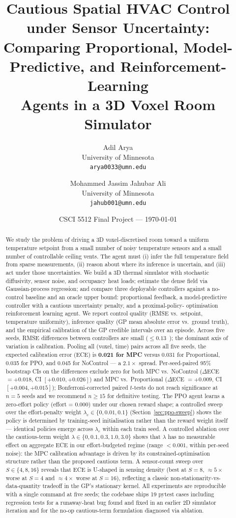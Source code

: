 \documentclass[11pt,letterpaper]{article}
\title{Cautious Spatial HVAC Control under Sensor Uncertainty:\\
       Comparing Proportional, Model-Predictive, and Reinforcement-Learning\\
       Agents in a 3D Voxel Room Simulator}
\author{
  Adil Arya \\ University of Minnesota \\ \texttt{arya0033@umn.edu}
  \and
  Mohammed Jassim Jahubar Ali \\ University of Minnesota \\ \texttt{jahub001@umn.edu}
}
\date{CSCI 5512 Final Project --- \today}
\begin{document}
\maketitle

\begin{abstract}
We study the problem of driving a 3D voxel-discretised room toward a uniform
temperature setpoint from a small number of noisy temperature sensors and
a small number of controllable ceiling vents. The agent must (i) infer the
full temperature field from sparse measurements, (ii) reason about where
its inference is uncertain, and (iii) act under those uncertainties. We
build a 3D thermal simulator with stochastic diffusivity, sensor noise,
and occupancy heat loads; estimate the dense field via Gaussian-process
regression; and compare three deployable controllers against a no-control
baseline and an oracle upper bound: proportional feedback, a model-predictive
controller with a cautious uncertainty penalty, and a proximal-policy-
optimisation reinforcement learning agent. We report control quality (RMSE vs.\ setpoint, temperature
uniformity), inference quality (GP mean absolute error vs.\ ground truth),
and the empirical calibration of the GP credible intervals over an episode.
Across five seeds, RMSE differences between controllers are small
($\le 0.13$~\textcelsius); the dominant axis of variation is
calibration. Pooling all (voxel, time) pairs across all five seeds, the
expected calibration error (ECE) is \textbf{0.021 for MPC} versus 0.031
for Proportional, 0.035 for PPO, and 0.045 for NoControl --- a $2.1\times$
spread. Per-seed-paired 95\% bootstrap CIs on the differences exclude zero
for both MPC vs.\ NoControl ($\Delta$ECE $= +0.018$, CI $[+0.010, +0.026]$)
and MPC vs.\ Proportional ($\Delta$ECE $= +0.009$, CI $[+0.004, +0.015]$);
Bonferroni-corrected paired $t$-tests do not reach significance at
$n = 5$ seeds and we recommend $n \ge 15$ for definitive testing. The
PPO agent learns a zero-effort policy (effort = $0.000$) under our
chosen reward shape; a controlled sweep over the effort-penalty weight
$\lambda_e \in \{0, 0.01, 0.1\}$ (Section~\ref{sec:ppo-sweep}) shows
the policy is determined by training-seed initialisation rather than
the reward weight itself --- identical policies emerge across
$\lambda_e$ within each train seed. A controlled ablation over the
cautious-term weight $\lambda \in \{0, 0.1, 0.3, 1.0, 3.0\}$ shows that
$\lambda$ has no measurable effect on aggregate ECE in our
effort-budgeted regime (range $< 0.001$, within per-seed noise): the MPC
calibration advantage is driven by its constrained-optimisation
structure rather than the proposed cautious term. A sensor-count sweep
over $S \in \{4, 8, 16\}$ reveals that ECE is U-shaped in sensing
density (best at $S = 8$, $\approx 5\times$ worse at $S = 4$ and
$\approx 4\times$ worse at $S = 16$), reflecting a classic
non-stationarity-vs-data-quantity tradeoff in the GP's stationary
kernel. All experiments are reproducible with a single command at five
seeds; the codebase ships 19 pytest cases including regression tests for
a runaway-heat bug found and fixed in an earlier 2D simulator iteration
and for the no-op cautious-term formulation diagnosed via ablation.
\end{abstract}
\end{document}
